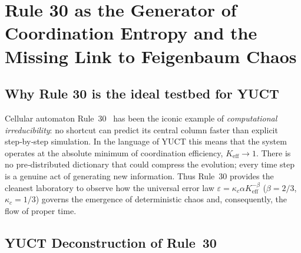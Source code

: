 \documentclass[12pt,a4paper]{article}
\newcommand{\Keff}{K_{\mathrm{eff}}}
\begin{document}
{\section{Rule 30 as the Generator of Coordination Entropy and the Missing Link to Feigenbaum Chaos}
\label{sec:rule30}

\subsection{Why Rule 30 is the ideal testbed for YUCT}
Cellular automaton Rule~30~\cite{Wolfram2002} has been the iconic example of
\textit{computational irreducibility}: no shortcut can predict its central column
faster than explicit step‑by‑step simulation. In the language of YUCT this means
that the system operates at the absolute minimum of coordination efficiency,
\(\Keff \to 1\). There is no pre‑distributed dictionary that could compress the
evolution; every time step is a genuine act of generating new information.
Thus Rule~30 provides the cleanest laboratory to observe how the universal
error law \(\varepsilon = \kappa_c \alpha \Keff^{-\beta}\) (\(\beta=2/3\),
\(\kappa_c=1/3\)) governs the emergence of deterministic chaos and,
consequently, the flow of proper time.

\subsection{YUCT Deconstruction of Rule~30}
\label{subsec:deconstruction}

}
\end{document}
